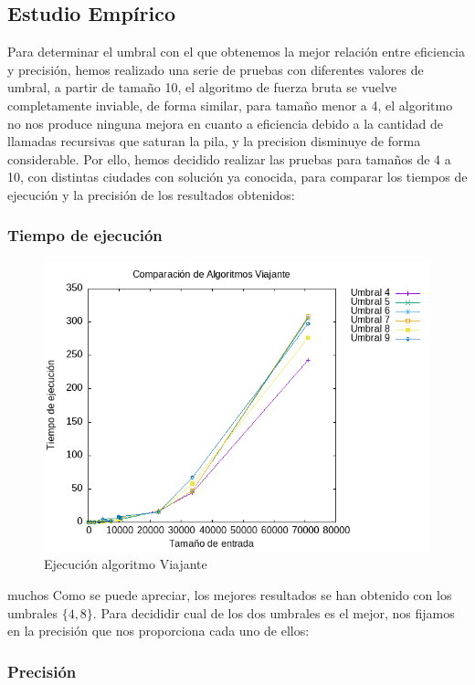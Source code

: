 \documentclass[11pt,openany]{book}
\begin{document}
\subsection{Estudio Empírico}
Para determinar el umbral con el que obtenemos la mejor relación entre eficiencia y precisión, hemos
realizado una serie de pruebas con diferentes valores de umbral, a partir de tamaño 10, el algoritmo de
fuerza bruta se vuelve completamente inviable, de forma similar, para tamaño menor a 4, el algoritmo
no nos produce ninguna mejora en cuanto a eficiencia debido a la cantidad de llamadas recursivas que
saturan la pila, y la precision disminuye de forma considerable. Por ello, hemos decidido realizar
las pruebas para tamaños de 4 a 10, con distintas ciudades con solución ya conocida, para comparar
los tiempos de ejecución y la precisión de los resultados obtenidos:
\subsubsection*{Tiempo de ejecución}
\begin{center}
      \begin{figure}[H]
            \centering
            \includegraphics[width=0.7\linewidth]{assets/Img/UmbralP3.png}
            \caption{Ejecución algoritmo Viajante}
            \label{fig:Viajante}
      \end{figure}
\end{center}muchos
Como se puede apreciar, los mejores resultados se han obtenido con los umbrales $\{4,8\}$.
Para decididir cual de los dos umbrales es el mejor, nos fijamos en la precisión
que nos proporciona cada uno de ellos:
\subsubsection*{Precisión}
\end{document}
